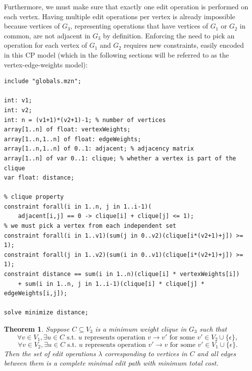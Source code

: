 \documentclass{article}
\newtheorem{theorem}{Theorem}
\theoremstyle{definition}
\begin{document}
Furthermore, we must make sure that exactly one edit operation is performed on each vertex. Having multiple edit operations per vertex is already impossible because vertices of $G_3$, representing operations that have vertices of $G_1$ or $G_2$ in common, are not adjacent in $G_3$ by definition. Enforcing the need to pick an operation for each vertex of $G_1$ and $G_2$ requires new constraints, easily encoded in this CP model (which in the following sections will be referred to as the vertex-edge-weights model):
\begin{lstlisting}
include "globals.mzn";

int: v1;
int: v2;
int: n = (v1+1)*(v2+1)-1; % number of vertices
array[1..n] of float: vertexWeights;
array[1..n,1..n] of float: edgeWeights;
array[1..n,1..n] of 0..1: adjacent; % adjacency matrix
array[1..n] of var 0..1: clique; % whether a vertex is part of the clique
var float: distance;

% clique property
constraint forall(i in 1..n, j in 1..i-1)(
    adjacent[i,j] == 0 -> clique[i] + clique[j] <= 1);
% we must pick a vertex from each independent set
constraint forall(i in 1..v1)(sum(j in 0..v2)(clique[i*(v2+1)+j]) >= 1);
constraint forall(j in 1..v2)(sum(i in 0..v1)(clique[i*(v2+1)+j]) >= 1);
constraint distance == sum(i in 1..n)(clique[i] * vertexWeights[i])
    + sum(i in 1..n, j in 1..i-1)(clique[i] * clique[j] * edgeWeights[i,j]);

solve minimize distance;
\end{lstlisting}
\begin{theorem}
  Suppose $C \subseteq V_3$ is a minimum weight clique in $G_3$ such that
  \begin{equation}
    \tag{C1}
    \label{eq:cond1}
    \forall v \in V_1, \exists u \in C \text{ s.t. } u \text{ represents operation } v \to v' \text{ for some } v' \in V_2 \cup \{ \epsilon \},
  \end{equation}
  \begin{equation}
    \tag{C2}
    \label{eq:cond2}
  \forall v \in V_2, \exists u \in C \text{ s.t. } u \text{ represents operation } v' \to v \text{ for some } v' \in V_1 \cup \{ \epsilon \}.
  \end{equation}
  Then the set of edit operations $\lambda$ corresponding to vertices in $C$ and all edges between them is a complete minimal edit path with minimum total cost.
\end{theorem}
\end{document}
